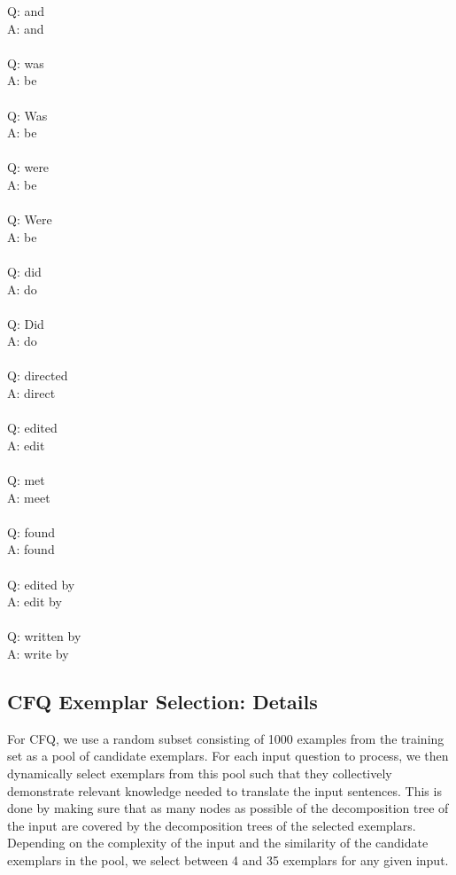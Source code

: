 \documentclass{article} \usepackage{iclr2022_conference,times}
\newcommand{\prompt}[1]{{\footnotesize \textsf{#1}}}
\begin{document}
\prompt{Q: and \\
A: and \\
 \\
Q: was \\
A: be \\
 \\
Q: Was \\
A: be \\
 \\
Q: were \\
A: be \\
 \\
Q: Were \\
A: be \\
 \\
Q: did \\
A: do \\
 \\
Q: Did \\
A: do \\
 \\
Q: directed \\
A: direct \\
 \\
Q: edited \\
A: edit \\
 \\
Q: met \\
A: meet \\
 \\
Q: found \\
A: found \\
 \\
Q: edited by \\
A: edit by \\
 \\
Q: written by \\
A: write by}

\subsection{CFQ Exemplar Selection: Details}
\label{app:cfq_exemplar_selection}

For CFQ, we use a random subset consisting of 1000 examples from the training set as a pool of candidate exemplars. For each input question to process, we then dynamically select exemplars from this pool such that they collectively demonstrate relevant knowledge needed to translate the input sentences. This is done by making sure that as many nodes as possible of the decomposition tree of the input are covered by the decomposition trees of the selected exemplars. Depending on the complexity of the input and the similarity of the candidate exemplars in the pool, we select between 4 and 35 exemplars for any given input.
\end{document}
